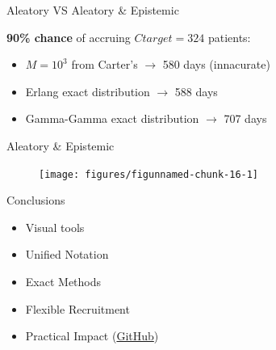 \documentclass[english]{beamer}\usepackage[]{graphicx}\usepackage[]{xcolor}
\newenvironment{knitrout}{}{} %
\begin{document}
\begin{frame}{Aleatory VS Aleatory \& Epistemic}

\textbf{90\% chance} of accruing $Ctarget=324$ patients: 

\begin{itemize}[label = ]
\item $M=10^3$ from Carter's $\rightarrow$ 580 days (innacurate)
\item Erlang exact distribution $\rightarrow$ 588 days
\item Gamma-Gamma exact distribution $\rightarrow$ 707 days
\end{itemize}
\end{frame}

\begin{frame}{Aleatory \& Epistemic}
\begin{figure}
\begin{knitrout}
\color{fgcolor}
\texttt{[image: figures/figunnamed-chunk-16-1]} 
\end{knitrout}
\end{figure}

\end{frame}

\begin{frame}{Conclusions}

\begin{itemize}[label = ]
\item Visual tools
\item Unified Notation
\item Exact Methods
\item Flexible Recruitment
\item Practical Impact (\href{https://github.com/ppasto/masterthesis}{GitHub})
\end{itemize}
\end{frame}
\end{document}
